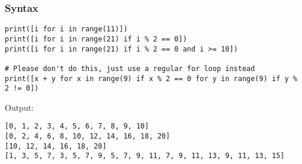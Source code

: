 \documentclass[11pt]{article}
\begin{document}
\subsubsection{Syntax}
\label{sec:org0f90f0d}
\begin{verbatim}
print([i for i in range(11)])
print([i for i in range(21) if i % 2 == 0])
print([i for i in range(21) if i % 2 == 0 and i >= 10])

# Please don't do this, just use a regular for loop instead
print([x + y for x in range(9) if x % 2 == 0 for y in range(9) if y % 2 != 0])
\end{verbatim}

 \noindent Output:

\label{org1f169ec}
\begin{verbatim}
[0, 1, 2, 3, 4, 5, 6, 7, 8, 9, 10]
[0, 2, 4, 6, 8, 10, 12, 14, 16, 18, 20]
[10, 12, 14, 16, 18, 20]
[1, 3, 5, 7, 3, 5, 7, 9, 5, 7, 9, 11, 7, 9, 11, 13, 9, 11, 13, 15]
\end{verbatim}


 \newpage
\end{document}
